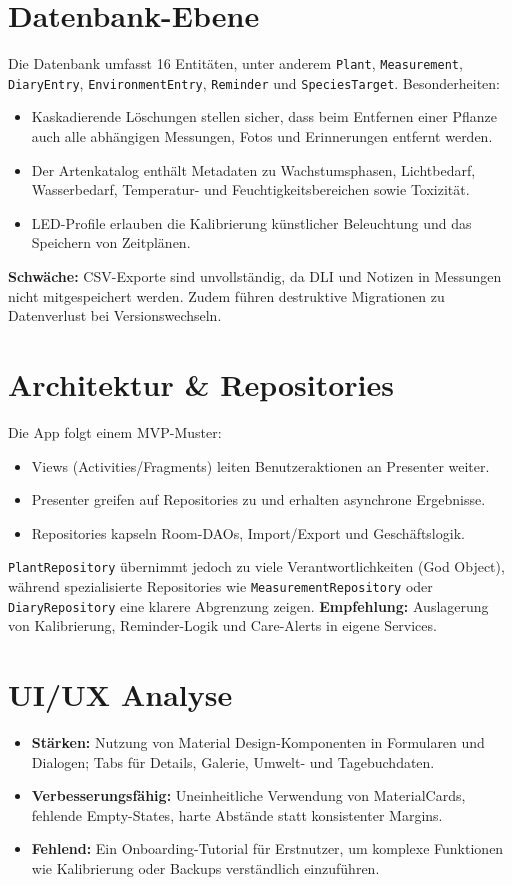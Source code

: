 \documentclass[14pt,a4paper]{report}
\begin{document}
\section{Datenbank-Ebene}
Die Datenbank umfasst 16 Entitäten, unter anderem \texttt{Plant}, \texttt{Measurement}, \texttt{DiaryEntry}, \texttt{EnvironmentEntry}, \texttt{Reminder} und \texttt{SpeciesTarget}. 
Besonderheiten:
\begin{itemize}
    \item Kaskadierende Löschungen stellen sicher, dass beim Entfernen einer Pflanze auch alle abhängigen Messungen, Fotos und Erinnerungen entfernt werden.
    \item Der Artenkatalog enthält Metadaten zu Wachstumsphasen, Lichtbedarf, Wasserbedarf, Temperatur- und Feuchtigkeitsbereichen sowie Toxizität.
    \item LED-Profile erlauben die Kalibrierung künstlicher Beleuchtung und das Speichern von Zeitplänen.
\end{itemize}
\textbf{Schwäche:} CSV-Exporte sind unvollständig, da DLI und Notizen in Messungen nicht mitgespeichert werden. Zudem führen destruktive Migrationen zu Datenverlust bei Versionswechseln.

\section{Architektur \& Repositories}
Die App folgt einem MVP-Muster: 
\begin{itemize}
    \item Views (Activities/Fragments) leiten Benutzeraktionen an Presenter weiter.
    \item Presenter greifen auf Repositories zu und erhalten asynchrone Ergebnisse.
    \item Repositories kapseln Room-DAOs, Import/Export und Geschäftslogik.
\end{itemize}
\texttt{PlantRepository} übernimmt jedoch zu viele Verantwortlichkeiten (God Object), während spezialisierte Repositories wie \texttt{MeasurementRepository} oder \texttt{DiaryRepository} eine klarere Abgrenzung zeigen.  
\textbf{Empfehlung:} Auslagerung von Kalibrierung, Reminder-Logik und Care-Alerts in eigene Services.

\section{UI/UX Analyse}
\begin{itemize}
    \item \textbf{Stärken:} Nutzung von Material Design-Komponenten in Formularen und Dialogen; Tabs für Details, Galerie, Umwelt- und Tagebuchdaten.
    \item \textbf{Verbesserungsfähig:} Uneinheitliche Verwendung von MaterialCards, fehlende Empty-States, harte Abstände statt konsistenter Margins.
    \item \textbf{Fehlend:} Ein Onboarding-Tutorial für Erstnutzer, um komplexe Funktionen wie Kalibrierung oder Backups verständlich einzuführen.
\end{itemize}
\end{document}
